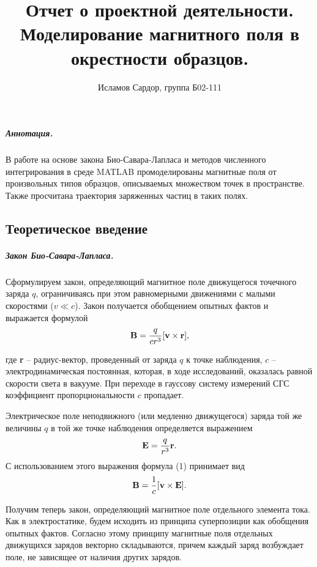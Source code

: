\documentclass[12pt,a4paper]{article}
\title{Отчет о проектной деятельности. \\
Моделирование магнитного поля в окрестности образцов.}
\author{Исламов Сардор, группа Б02-111}
\date{}
\begin{document}
\maketitle
\subparagraph*{Аннотация.} В работе на основе закона Био-Савара-Лапласа и методов численного интегрирования в среде MATLAB промоделированы магнитные поля от произвольных типов образцов, описываемых множеством точек в пространстве.  
Также просчитана траектория заряженных частиц в таких полях. 

\subsection*{Теоретическое введение}
\subparagraph*{Закон Био-Савара-Лапласа.} Сформулируем закон, определяющий магнитное поле движущегося точечного заряда $q$, ограничиваясь при этом равномерными движениями с малыми скоростями ($v \ll c$).
Закон получается обобщением опытных фактов и выражается формулой 
\begin{equation}
    \textbf{B} = {q \over c r^3} [\textbf{v} \times \textbf{r}],
\end{equation}

где \textbf{r} -- радиус-вектор, проведенный от заряда $q$ к точке наблюдения, $c$ -- электродинамическая постоянная, которая, в ходе исследований, оказалась равной скорости света в вакууме. 
При переходе в гауссову систему измерений СГС коэффициент пропорциональности $c$ пропадает.

Электрическое поле неподвижного (или медленно движущегося) заряда той же величины $q$ в той же точке наблюдения определяется выражением 
\[ \textbf{E} = {q \over r^3} \textbf{r}.\]
С использованием этого выражения формула (1) принимает вид 
\begin{equation}
    \textbf{B} = {1 \over c} [\textbf{v} \times \textbf{E}].    
\end{equation}


Получим теперь закон, определяющий магнитное поле отдельного элемента тока. 
Как в электростатике, будем исходить из принципа суперпозиции как обобщения опытных фактов.
Согласно этому принципу магнитные поля отдельных движущихся зарядов векторно складываются, причем каждый заряд возбуждает поле, не зависящее от наличия других зарядов.
\end{document}
